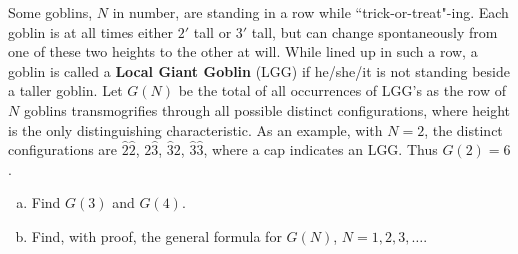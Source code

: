 Some goblins, $N$ in number, are standing in a row while ``trick-or-treat"-ing.
Each goblin is at all times either $2'$ tall or $3'$ tall, but can change
spontaneously from one of these two heights to the other at will. While lined
up in such a row, a goblin is called a \textbf{Local Giant Goblin} (LGG) if
he/she/it is not standing beside a taller goblin. Let $G(N)$ be the total of
all occurrences of LGG's as the row of $N$ goblins transmogrifies through all
possible distinct configurations, where height is the only distinguishing
characteristic. As an example, with $N = 2$, the distinct configurations are
$\hat{2}\hat{2}$, $2\hat{3}$, $\hat{3}2$, $\hat{3}\hat{3}$, where a cap
indicates an LGG. Thus $G(2) = 6$.

\begin{enumerate}[(a)]
\item Find $G(3)$ and $G(4)$.
\item Find, with proof, the general formula for $G(N)$, $N = 1, 2, 3, \dots$.
\end{enumerate}
